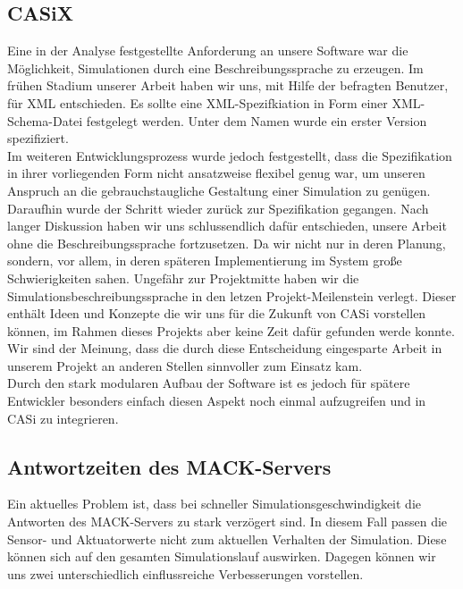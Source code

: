 \subsection{CASiX}\label{subsec:conc_open_questions_casix}
Eine in der Analyse festgestellte Anforderung an unsere Software war die Möglichkeit, Simulationen durch eine Beschreibungssprache zu erzeugen. Im frühen Stadium unserer Arbeit haben wir uns, mit Hilfe der befragten Benutzer, für XML entschieden. Es sollte eine XML-Spezifkiation in Form einer XML-Schema-Datei festgelegt werden. Unter dem Namen  wurde ein erster Version spezifiziert.\\

Im weiteren Entwicklungsprozess wurde jedoch festgestellt, dass die Spezifikation in ihrer vorliegenden Form nicht ansatzweise flexibel genug war, um unseren Anspruch an die gebrauchstaugliche Gestaltung einer Simulation zu genügen. Daraufhin wurde der Schritt wieder zurück zur Spezifikation gegangen. Nach langer Diskussion haben wir uns schlussendlich dafür entschieden, unsere Arbeit ohne die Beschreibungssprache fortzusetzen. Da wir nicht nur in deren Planung, sondern, vor allem, in deren späteren Implementierung im System große Schwierigkeiten sahen.
Ungefähr zur Projektmitte haben wir die Simulations\-beschreibungs\-sprache in den letzen Projekt-Meilenstein verlegt. Dieser enthält Ideen und Konzepte die wir uns für die Zukunft von CASi vorstellen können, im Rahmen dieses Projekts aber keine Zeit dafür gefunden werde konnte. Wir sind der Meinung, dass die durch diese Entscheidung eingesparte Arbeit in unserem Projekt an anderen Stellen sinnvoller zum Einsatz kam.\\

Durch den stark modularen Aufbau der Software ist es jedoch für spätere Entwickler besonders einfach diesen Aspekt noch einmal aufzugreifen und in CASi zu integrieren.

\subsection{Antwortzeiten des MACK-Servers}\label{subsec:conc_open_questions_mack}
Ein aktuelles Problem ist, dass bei schneller Simulationsgeschwindigkeit die Antworten des MACK-Servers zu stark verzögert sind. In diesem Fall passen die Sensor- und Aktuatorwerte nicht zum aktuellen Verhalten der Simulation. Diese können sich auf den gesamten Simulationslauf auswirken. Dagegen können wir uns zwei unterschiedlich einflussreiche Verbesserungen vorstellen. 

